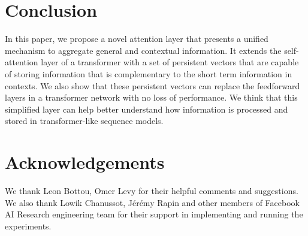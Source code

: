\documentclass{article}
\begin{document}
\section{Conclusion}
In this paper, we propose a novel attention layer that presents a unified mechanism to aggregate general and contextual information.
It extends the self-attention layer of a transformer with a set of persistent vectors that are capable of storing information that is complementary to the short term information in contexts.
We also show that these persistent vectors can replace the feedforward layers in a transformer network with no loss of performance.
We think that this simplified layer can help better understand how information is processed and stored in transformer-like sequence models.

\section*{Acknowledgements}
We thank Leon Bottou, Omer Levy for their helpful comments and suggestions.
We also thank Lowik Chanussot, Jérémy Rapin and other members of Facebook AI Research engineering team for their support in implementing and running the experiments.



\end{document}
